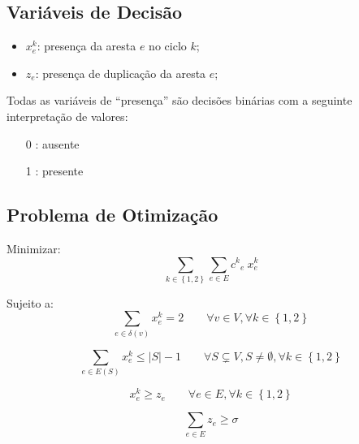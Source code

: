 \documentclass{article}
\newcommand{\Set}[1]{\ensuremath{\left\{#1\right\}}}
\newcommand{\Sum}[1]{\ensuremath{\displaystyle\sum\limits_{#1}}}
\newcommand{\abs}[1]{\ensuremath{\left| #1 \right|}}
\newcommand{\edge}{\ensuremath{e}}
\newcommand{\edges}{\ensuremath{E}}
\newcommand{\vertex}{\ensuremath{v}}
\newcommand{\vertices}{\ensuremath{V}}
\newcommand{\ncycles}{2}
\newcommand{\allCycles}{\ensuremath{\Set{1, \ncycles}}}
\newcommand{\cycle}{\ensuremath{k}}
\newcommand{\subvertices}{\ensuremath{S}}
\newcommand{\cost}[1]{\ensuremath{c^{#1}}}
\newcommand{\costke}{\ensuremath{\cost{\cycle}_{\edge}}}
\newcommand{\X}{\ensuremath{x}}
\newcommand{\xke}{\ensuremath{\X^{\cycle}_{\edge}}}
\newcommand{\ze}{\ensuremath{z_{\edge}}}
\newcommand{\similarity}{\ensuremath{\sigma}}
\begin{document}
\subsection{Variáveis de Decisão}
\label{constraint:variables}

\begin{itemize}
	\item $\xke$: presença da aresta $\edge$ no ciclo $\cycle$;
	\item $\ze$: presença de duplicação da aresta $\edge$;
\end{itemize}

Todas as variáveis de ``presença'' são decisões binárias com a seguinte interpretação de valores:

\begin{itemize}
	\item[0]: ausente
	\item[1]: presente
\end{itemize}

\subsection{Problema de Otimização}
\label{subsec:problem}

Minimizar:
\begin{equation}
    \label{eq:goal}
 	\Sum{\cycle \in \allCycles}
 	\Sum{\edge \in \edges}
 	\costke \ \xke
\end{equation}

Sujeito a:
\begin{equation}
	\label{constraint:vertex presence}
	\Sum{\edge \in \delta(\vertex)} \xke = 2
	\qquad
	\forall \vertex \in \vertices,
	\forall \cycle \in \allCycles
\end{equation}

\begin{equation}
	\label{constraint:no subcycle}
	\Sum{\edge \in \edges(\subvertices)} \xke \leqslant \abs{\subvertices} - 1
	\qquad
	\forall
		\subvertices \subsetneq \vertices,
		\subvertices \neq \emptyset,
		\forall \cycle \in \allCycles
\end{equation}

\begin{equation}
	\label{constraint:similarity compatibility}
	\xke \geqslant \ze
	\qquad
	\forall \edge \in \edges,
	\forall \cycle \in \allCycles
\end{equation}

\begin{equation}
	\label{constraint:similarity}
	\Sum{\edge \in \edges} \ze \geqslant \similarity
\end{equation}
\end{document}
